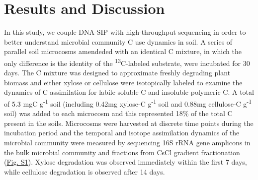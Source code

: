 \section{Results and Discussion}

In this study, we couple DNA-SIP with high-throughput sequencing in order to better understand microbial community C use dynamics in soil. A series of parallel soil microcosms amendeded with an identical C mixture, in which the only difference is the identity of the \textsuperscript{13}C-labeled substrate, were incubated for 30 days. The C mixture was designed to approximate freshly degrading plant biomass and either xylose or cellulose were isotopically labeled to examine the dynamics of C assimilation for labile soluble C and insoluble polymeric C. A total of 5.3 mgC g\textsuperscript{-1} soil (including 0.42mg xylose-C g\textsuperscript{-1} soil and 0.88mg cellulose-C g\textsuperscript{-1} soil) was added to each microcosm and this represented 18\% of the total C present in the soils. Microcosms were harvested at discrete time points during the incubation period and the temporal and isotope assimilation dynamics of the microbial community were measured by sequencing 16S rRNA gene amplicons in the bulk microbial community and fractions from CsCl gradient fractionation (\href{https://www.authorea.com/users/3537/articles/8459/master/file/figures/20140708_ConceptualFig2/20140708_ConceptualFig2.pdf}{Fig. S1}). Xylose degradation was observed immediately within the first 7 days, while cellulose degradation is observed after 14 days.

